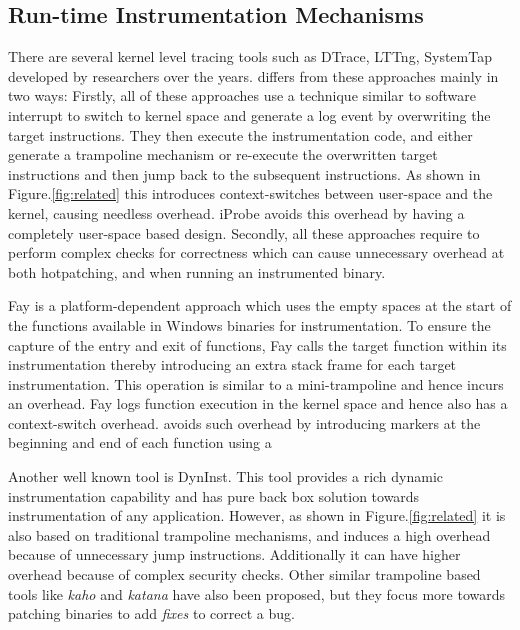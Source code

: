 \subsection{Run-time Instrumentation Mechanisms}
There are several kernel level tracing tools such as DTrace, LTTng, SystemTap \cite{dtrace,lttng,systemtap} developed by researchers over the years.
\iprobe differs from these approaches mainly in two ways: Firstly, all of these approaches use a technique similar to software interrupt to switch to kernel space and generate a log event by overwriting the target instructions. 
They then execute the instrumentation code, and either generate a trampoline mechanism or re-execute the overwritten target instructions and then jump back to the subsequent instructions. 
As shown in Figure.\ref{fig:related} this introduces context-switches between user-space and the kernel, causing needless overhead. 
iProbe avoids this overhead by having a completely user-space based design.
Secondly, all these approaches require to perform complex checks for correctness which can cause unnecessary overhead at both hotpatching, and when running an instrumented binary. 

Fay \cite{fay} is a platform-dependent approach which uses the empty spaces at the start of the functions available in Windows binaries for instrumentation. 
To ensure the capture of the entry and exit of functions, Fay calls the target function within its instrumentation thereby introducing an extra stack frame for each target instrumentation. 
This operation is similar to a mini-trampoline and hence incurs an overhead. 
Fay logs function execution in the kernel space and hence also has a context-switch overhead.
\iprobe avoids such overhead by introducing markers at the beginning and end of
each function using a 

Another well known tool is DynInst\cite{dyninst}. This tool provides a rich dynamic instrumentation capability and has pure back box solution towards instrumentation of any application.
However, as shown in Figure.\ref{fig:related} it is also based on traditional trampoline mechanisms, and induces a high overhead because of unnecessary jump instructions.
Additionally it can have higher overhead because of complex security checks. 
Other similar trampoline based tools like \emph{kaho} and \emph{katana}\cite{katana,kaho} have also been proposed, but they focus more towards patching binaries to add \emph{fixes} to correct a bug.

